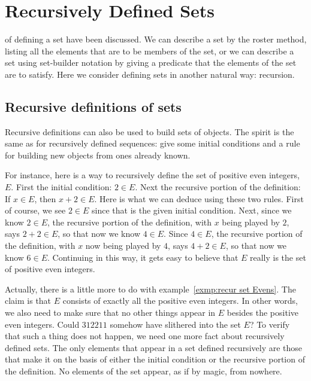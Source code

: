 \chapter{Recursively Defined Sets}


 of defining a set have been discussed. We can describe a set
by the roster method, listing all the elements that are to be members of the set, or 
we can describe a set using set-builder notation by  giving a predicate that the elements
of the set are to satisfy. Here we consider defining sets in another natural way: recursion.

\section{Recursive definitions of sets}
 Recursive definitions can also be used to build sets of objects. The spirit
is the same as for recursively defined sequences: give some initial conditions and
a rule for building new objects from ones already known.

\begin{exmp}\label{exmp:recur set Evens}
  For instance, here is a
 way to recursively define the set of positive even integers, $E$. First the
 initial condition: $2\in E$. Next the recursive portion of the definition: If
 $x\in E$, then $x+2\in E$. Here is what we can deduce using these two rules. First
 of course, we see $2\in E$ since that is the given initial condition. Next, since
 we know $2\in E$, the recursive portion of the definition, with $x$ being played
 by $2$,  says $2+2\in E$, so that now we know $4\in E$. Since $4\in E$, the
 recursive portion of the definition, with $x$ now being played 
 by $4$,  says $4+2\in E$, so that now we know $6\in E$. Continuing in this way, it
 gets easy to believe that $E$ really is the set of positive even integers.
\end{exmp}

\clearpage
 Actually, there is a little more to do with example~\ref{exmp:recur set Evens}. The claim is that
$E$ consists of exactly all the positive even integers. In other words, we also
need to make sure that no other things appear in $E$ besides the positive even
integers. Could $312211$ somehow have slithered into the set $E$? To verify that
such a thing does not happen, we need one more fact about recursively defined
sets. The only elements that appear in a set defined recursively are those that
make it on the basis of either the initial condition or the recursive portion of
the definition. No elements of the set appear, as if by magic, from nowhere.

